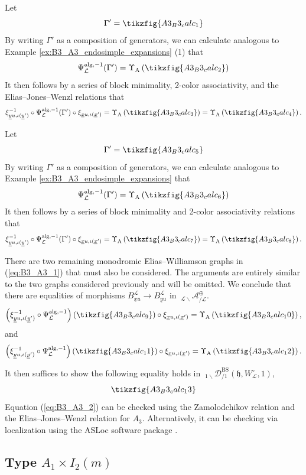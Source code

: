 \documentclass{amsart}
\newcommand{\scrL}{\mathcal{L}}
\newcommand{\fr}[1]{\mathfrak{#1}}
\DeclareMathOperator{\alg}{alg}
\DeclareMathOperator{\Abe}{A}
\DeclareMathOperator{\BS}{BS}
\newcommand{\EWmon}[2]{\:_{#1 \backslash} \mathcal{D}_{/ #2} }
\newcommand{\Amon}[2]{\:_{#1 \backslash} \mathcal{A}_{/ #2} }
\newcommand{\ux}{\underline{x}}
\newcommand{\uy}{\underline{y}}
\theoremstyle{definition}
\numberwithin{equation}{subsection}
\begin{document}
Let 
\[\Gamma' = \tikzfig{A3_B3_calc_1} \]
By writing $\Gamma'$ as a composition of generators, we can calculate analogous to Example \ref{ex:B3_A3_endosimple_expansions} (1) that
\[\Psi_{\scrL}^{\alg, -1} (\Gamma') = \Upsilon_{\Abe} \left( \tikzfig{A3_B3_calc_2} \right)\]
It then follows by a series of block minimality, 2-color associativity, and the Elias--Jones--Wenzl relations that
\[\xi_{\uy u, \iota (\uy')}^{-1} \circ \Psi_{\scrL}^{\alg, -1} (\Gamma') \circ \xi_{\ux u, \iota (\ux')} = \Upsilon_{\Abe} \left( \tikzfig{A3_B3_calc_3} \right) = \Upsilon_{\Abe} \left(  \tikzfig{A3_B3_calc_4} \right).\]

Let 
\[\Gamma' = \tikzfig{A3_B3_calc_5}\]
By writing $\Gamma'$ as a composition of generators, we can calculate analogous to Example \ref{ex:B3_A3_endosimple_expansions} that
\[\Psi_{\scrL}^{\alg, -1} (\Gamma') = \Upsilon_{\Abe} \left( \tikzfig{A3_B3_calc_6}\right)\]
It then follows by a series of block minimality and 2-color associativity relations that
\[\xi_{\uy u, \iota (\uy')}^{-1} \circ \Psi_{\scrL}^{\alg, -1} (\Gamma') \circ \xi_{\ux u, \iota (\ux')} = \Upsilon_{\Abe} \left( \tikzfig{A3_B3_calc_7}\right) = \Upsilon_{\Abe} \left( \tikzfig{A3_B3_calc_8} \right).\]

There are two remaining monodromic Elias--Williamson graphs in (\ref{eq:B3_A3_1}) that must also be considered. The arguments are entirely similar to the two graphs considered previously and will be omitted.
We conclude that there are equalities of morphisms $B_{\ux u}^{\scrL} \to B_{\uy u}^{\scrL}$ in $\Amon{\scrL}{\scrL}^{\oplus}$.
\[\left( \xi_{\uy u, \iota (\uy')}^{-1} \circ \Psi_{\scrL}^{\alg, -1} \right) \left(  \tikzfig{A3_B3_calc_9}\right) \circ \xi_{\ux u, \iota (\ux')} = \Upsilon_{\Abe} \left( \tikzfig{A3_B3_calc_10} \right),\]
and
\[\left( \xi_{\uy u, \iota (\uy')}^{-1} \circ \Psi_{\scrL}^{\alg, -1} \right) \left( \tikzfig{A3_B3_calc_11} \right) \circ \xi_{\ux u, \iota (\ux')} = \Upsilon_{\Abe} \left( \tikzfig{A3_B3_calc_12} \right).\]

It then suffices to show the following equality holds in $\EWmon{1}{1}^{\BS} (\fr{h}, W_{\scrL}^{\circ}, 1)$,
\begin{equation}\label{eq:B3_A3_2}
    \tikzfig{A3_B3_calc_13}
\end{equation}
Equation (\ref{eq:B3_A3_2}) can be checked using the Zamolodchikov relation and the Elias--Jones--Wenzl relation for $A_3$. 
Alternatively, it can be checking via localization using the ASLoc software package \cite{GJW23}.

\subsection{Type \texorpdfstring{$A_1 \times I_2 (m)$}{A1 x I2(m)}}
\end{document}
